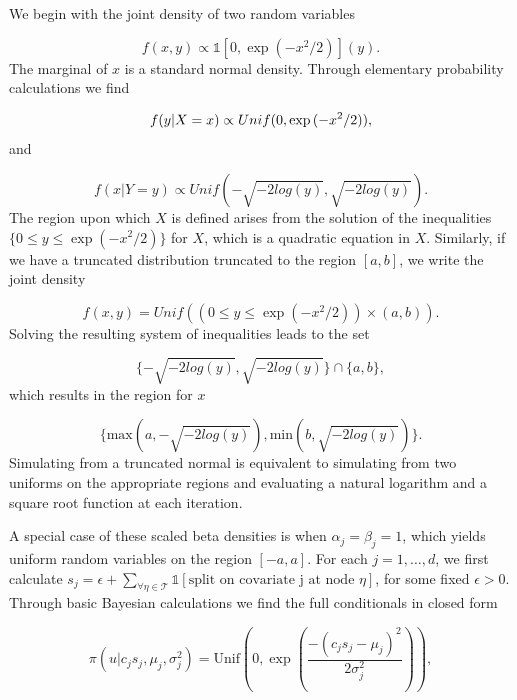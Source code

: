 We begin with the joint density of two random variables 

\begin{equation}
f(x,y) \propto \mathds{1}[0, \exp{(-x^2/2)}](y).
\end{equation}
The marginal of $x$ is a standard normal density. Through elementary probability calculations we find 

\begin{equation}\newnot{symbol:unif}
f(y\vert X=x) \propto Unif(0, \exp{(-x^2/2)}),
\end{equation}
 and 
 
 \begin{equation}
f(x\vert Y=y) \propto Unif(-\sqrt{-2log(y)}, \sqrt{-2log(y)}).
\end{equation}
The region upon which $X$ is defined arises from the solution of the inequalities $\{0\leq y \leq \exp{(-x^2/2)} \} $ for $X$, which is a quadratic equation in $X$. Similarly, if we have a truncated distribution truncated to the region $[a,b]$, we write the joint density 
 
 \begin{equation}
 f(x,y)=Unif((0\leq y\leq \exp{(-x^2/2)})\times (a,b)).
 \end{equation}
 Solving the resulting system of inequalities leads to the set 
 
 \begin{equation}
 \{-\sqrt{-2log(y)}, \sqrt{-2log(y)} \} \cap \{a, b\},
 \end{equation}
which results in the region for $x$

\begin{equation}
 \{\text{max}(a,-\sqrt{-2log(y)}), \text{min}(b,\sqrt{-2log(y)} )\} .
 \end{equation}
 Simulating from a truncated normal is equivalent to simulating from two uniforms on the appropriate regions and evaluating a natural logarithm and a square root function at each iteration. 
 
 A special case of these scaled beta densities is when $\alpha_j=\beta_j=1$, which yields uniform random variables on the region $[-a,a]$. 
For each $j=1, \dots, d$, we first calculate $s_j = \epsilon+\sum_{\forall \eta \in \mathcal{T}}\mathds{1}[\text{split on covariate j at node $\eta$}]$, for some fixed $\epsilon>0$.
Through basic Bayesian calculations we find the full conditionals in closed form
 
\begin{equation}\label{eqn:u_given_cjsj}
\pi(u \vert c_js_j, \mu_j, \sigma_j^2)= \text{Unif}(0, \exp{(\frac{-(c_js_j-\mu_j)^2}{2\sigma_j^2} )}),
\end{equation}

